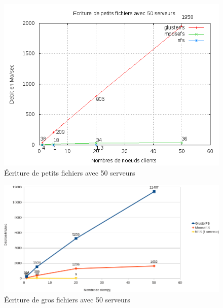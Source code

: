 \documentclass[12pt]{report}
\begin{document}
\begin{figure}[H]
\begin{center}
\includegraphics[bb=0 0 640 480,width=14cm]{images/srv50ws2.png}
\caption{Écriture de petits fichiers avec 50 serveurs}
\end{center}
\end{figure} 
		        \begin{figure}[H]
			        \begin{center}
				        \includegraphics[width=1\linewidth]{graph/calc/50WB.png}
				        \caption{Écriture de gros fichiers avec 50 serveurs}
			        \end{center}
		        \end{figure}
\end{document}
